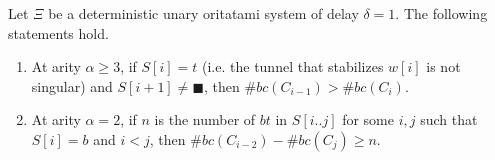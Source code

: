 

\begin{theorem}
\label{TTT}
Let $\Xi$ be a deterministic unary oritatami system of delay $\delta = 1$. The following statements hold.
\begin{enumerate}
\item At arity $\alpha \geq 3$, if $S[i] = t$ (i.e. the tunnel that stabilizes $w[i]$ is not singular) and $S[i+1] \neq \blacksquare$, then $\#bc(C_{i-1}) > \#bc(C_i)$.
\item At arity $\alpha = 2$, if $n$ is the number of $bt$ in $S[i..j]$ for some $i,j$ such that $S[i] = b$ and $i < j$, then $\#bc(C_{i-2}) - \#bc(C_{j}) \geq n$.
\end{enumerate}
\end{theorem}


